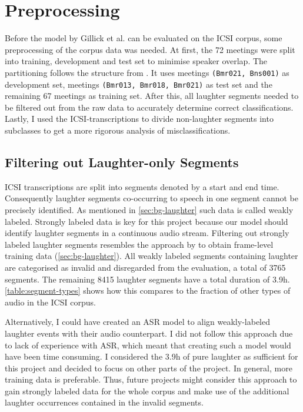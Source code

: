 \documentclass[bsc,frontabs,parskip,deptreport]{infthesis}
\begin{document}
\section{Preprocessing} \label{sec:preprocessing}
Before the model by Gillick et al. can be evaluated on the ICSI corpus, some preprocessing of the corpus data was needed.
At first, the 72 meetings were split into training, development and test set to minimise speaker overlap. The partitioning follows the structure from \citet{renals2014neural}. It uses meetings \texttt{(Bmr021, Bns001)} as development set, meetings \texttt{(Bmr013, Bmr018, Bmr021)} as test set and the remaining 67 meetings as training set.
After this, all laughter segments needed to be filtered out from the raw data to accurately determine correct classifications. 
Lastly, I used the ICSI-transcriptions to divide non-laughter segments into subclasses to get a more rigorous analysis of misclassifications.

\subsection{Filtering out Laughter-only Segments} \label{subsec:filter-laughter}
ICSI transcriptions are split into segments denoted by a start and end time.
Consequently laughter segments co-occurring to speech in one segment cannot be precisely identified.
As mentioned in \autoref{sec:bg-laughter} such data is called weakly labeled.
Strongly labeled data is key for this project because our model should identify laughter segments in a continuous audio stream.
Filtering out strongly labeled laughter segments resembles the approach by \citet{knox2006automatic} to obtain frame-level training data (\autoref{sec:bg-laughter}). 
All weakly labeled segments containing laughter are categorised as invalid and disregarded from the evaluation, a total of 3765 segments.
The remaining 8415 laughter segments have a total duration of 3.9h. \autoref{table:segment-types} shows how this compares to the fraction of other types of audio in the ICSI corpus.

Alternatively, I could have created an ASR model to align weakly-labeled laughter events with their audio counterpart. 
I did not follow this approach due to lack of experience with ASR, which meant that creating such a model would have been time consuming. I considered the 3.9h of pure laughter as sufficient for this project and decided to focus on other parts of the project.
In general, more training data is preferable. Thus, future projects might consider this approach to gain strongly labeled data for the whole corpus and make use of the additional laughter occurrences contained in the invalid segments. 
\end{document}
